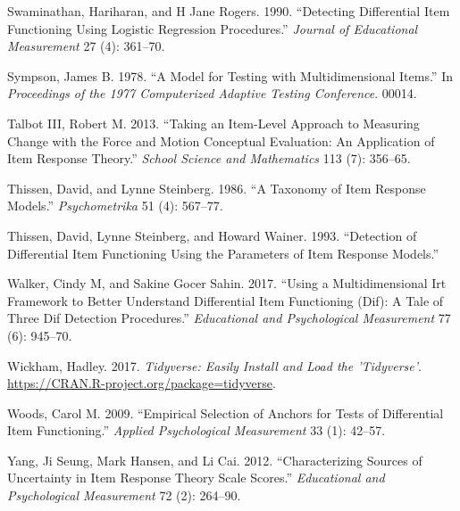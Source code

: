 \documentclass[
  11pt,
]{article}
\begin{document}
\leavevmode\hypertarget{ref-swaminathan1990detecting}{}%
Swaminathan, Hariharan, and H Jane Rogers. 1990. ``Detecting Differential Item Functioning Using Logistic Regression Procedures.'' \emph{Journal of Educational Measurement} 27 (4): 361--70.

\leavevmode\hypertarget{ref-sympson1978model}{}%
Sympson, James B. 1978. ``A Model for Testing with Multidimensional Items.'' In \emph{Proceedings of the 1977 Computerized Adaptive Testing Conference}. 00014.

\leavevmode\hypertarget{ref-talbot2013taking}{}%
Talbot III, Robert M. 2013. ``Taking an Item-Level Approach to Measuring Change with the Force and Motion Conceptual Evaluation: An Application of Item Response Theory.'' \emph{School Science and Mathematics} 113 (7): 356--65.

\leavevmode\hypertarget{ref-thissen1986taxonomy}{}%
Thissen, David, and Lynne Steinberg. 1986. ``A Taxonomy of Item Response Models.'' \emph{Psychometrika} 51 (4): 567--77.

\leavevmode\hypertarget{ref-thissen1993detection}{}%
Thissen, David, Lynne Steinberg, and Howard Wainer. 1993. ``Detection of Differential Item Functioning Using the Parameters of Item Response Models.''

\leavevmode\hypertarget{ref-walker2017using}{}%
Walker, Cindy M, and Sakine Gocer Sahin. 2017. ``Using a Multidimensional Irt Framework to Better Understand Differential Item Functioning (Dif): A Tale of Three Dif Detection Procedures.'' \emph{Educational and Psychological Measurement} 77 (6): 945--70.

\leavevmode\hypertarget{ref-tidy}{}%
Wickham, Hadley. 2017. \emph{Tidyverse: Easily Install and Load the 'Tidyverse'}. \url{https://CRAN.R-project.org/package=tidyverse}.

\leavevmode\hypertarget{ref-woods2009empirical}{}%
Woods, Carol M. 2009. ``Empirical Selection of Anchors for Tests of Differential Item Functioning.'' \emph{Applied Psychological Measurement} 33 (1): 42--57.

\leavevmode\hypertarget{ref-yang2012characterizing}{}%
Yang, Ji Seung, Mark Hansen, and Li Cai. 2012. ``Characterizing Sources of Uncertainty in Item Response Theory Scale Scores.'' \emph{Educational and Psychological Measurement} 72 (2): 264--90.
\end{document}

